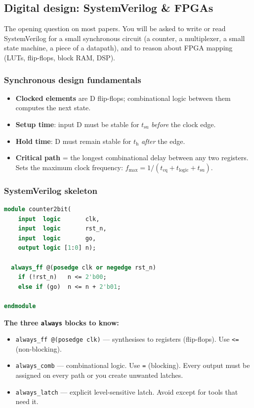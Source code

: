\documentclass[11pt,a4paper]{article}
\begin{document}
\subsection{Digital design: SystemVerilog \& FPGAs}

\begin{must}
The opening question on most papers. You will be asked to write or read SystemVerilog for a small synchronous circuit (a counter, a multiplexer, a small state machine, a piece of a datapath), and to reason about FPGA mapping (LUTs, flip-flops, block RAM, DSP).
\end{must}

\subsubsection*{Synchronous design fundamentals}

\begin{itemize}[leftmargin=*,itemsep=1pt]
  \item \textbf{Clocked elements} are D flip-flops; combinational logic between them computes the next state.
  \item \textbf{Setup time}: input D must be stable for $t_{\text{su}}$ \emph{before} the clock edge.
  \item \textbf{Hold time}: D must remain stable for $t_{\text{h}}$ \emph{after} the edge.
  \item \textbf{Critical path} = the longest combinational delay between any two registers. Sets the maximum clock frequency: $f_{\max} = 1/(t_{\text{cq}} + t_{\text{logic}} + t_{\text{su}})$.
\end{itemize}

\subsubsection*{SystemVerilog skeleton}

\begin{lstlisting}[language=sv]
module counter2bit(
    input  logic       clk,
    input  logic       rst_n,
    input  logic       go,
    output logic [1:0] n);

  always_ff @(posedge clk or negedge rst_n)
    if (!rst_n)   n <= 2'b00;
    else if (go)  n <= n + 2'b01;

endmodule
\end{lstlisting}

\textbf{The three \texttt{always} blocks to know:}
\begin{itemize}[leftmargin=*,itemsep=1pt]
  \item \verb|always_ff @(posedge clk)| --- synthesises to registers (flip-flops). Use \verb|<=| (non-blocking).
  \item \verb|always_comb| --- combinational logic. Use \verb|=| (blocking). Every output must be assigned on every path or you create unwanted latches.
  \item \verb|always_latch| --- explicit level-sensitive latch. Avoid except for tools that need it.
\end{itemize}
\end{document}
